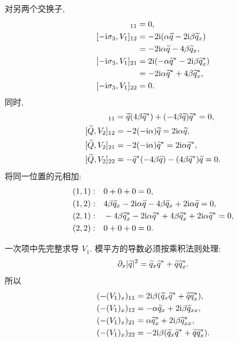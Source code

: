 对另两个交换子,
\begin{align*}
[-\ii\sg,V_1]_{11}&=0,\\
[-\ii\sg,V_1]_{12}
&=-2\ii(\alpha\widetilde q-2\ii\beta\widetilde q_x)\\
&=-2\ii\alpha\widetilde q-4\beta\widetilde q_x,\\
[-\ii\sg,V_1]_{21}
&=2\ii(-\alpha\conj{\widetilde q}
-2\ii\beta\conj{\widetilde q_x})\\
&=-2\ii\alpha\conj{\widetilde q}
+4\beta\conj{\widetilde q_x},\\
[-\ii\sg,V_1]_{22}&=0.
\end{align*}
同时,
\begin{align*}
[\widetilde Q,V_2]_{11}
&=\widetilde q(4\beta\conj{\widetilde q})
+(-4\beta\widetilde q)\conj{\widetilde q}=0,\\
[\widetilde Q,V_2]_{12}
&=-2(-\ii\alpha)\widetilde q
=2\ii\alpha\widetilde q,\\
[\widetilde Q,V_2]_{21}
&=-2(-\ii\alpha)\conj{\widetilde q}
=2\ii\alpha\conj{\widetilde q},\\
[\widetilde Q,V_2]_{22}
&=-\conj{\widetilde q}(-4\beta\widetilde q)
-(4\beta\conj{\widetilde q})\widetilde q=0.
\end{align*}
将同一位置的元相加:
\begin{align*}
(1,1):\quad&0+0+0=0,\\
(1,2):\quad&4\beta\widetilde q_x
-2\mathrm{i}\alpha\widetilde q-4\beta\widetilde q_x
+2\mathrm{i}\alpha\widetilde q=0,\\
(2,1):\quad&-4\beta{\widetilde q_x}^{*}
-2\mathrm{i}\alpha{\widetilde q}^{*}
+4\beta{\widetilde q_x}^{*}
+2\mathrm{i}\alpha{\widetilde q}^{*}=0,\\
(2,2):\quad&0+0+0=0.
\end{align*}
\par\smallskip\noindent 一次项中先完整求导 $V_1$.\quad
模平方的导数必须按乘积法则处理:
\begin{equation*}
\partial_x|\widetilde q|^2
=\widetilde q_x{\widetilde q}^{*}
+\widetilde q{\widetilde q_x}^{*}.
\end{equation*}
所以
\begin{align*}
(-(V_1)_x)_{11}
&=2\mathrm{i}\beta
(\widetilde q_x{\widetilde q}^{*}
+\widetilde q{\widetilde q_x}^{*}),\\
(-(V_1)_x)_{12}
&=-\alpha\widetilde q_x+2\mathrm{i}\beta\widetilde q_{xx},\\
(-(V_1)_x)_{21}
&=\alpha{\widetilde q_x}^{*}
+2\mathrm{i}\beta{\widetilde q_{xx}}^{*},\\
(-(V_1)_x)_{22}
&=-2\mathrm{i}\beta
(\widetilde q_x{\widetilde q}^{*}
+\widetilde q{\widetilde q_x}^{*}).
\end{align*}

